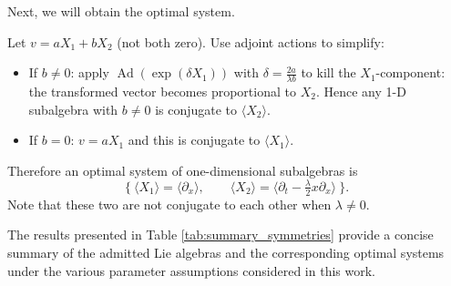 \documentclass{article}
\begin{document}
Next, we will obtain the optimal system.
\par 
Let $v=a X_1+b X_2$ (not both zero). Use adjoint actions to simplify:
\begin{itemize}
\item 
If $b\neq0$: apply $\operatorname{Ad}(\exp(\delta X_1))$ with $\delta=\tfrac{2a}{\lambda b}$ to kill the $X_1$-component: the transformed vector becomes proportional to $X_2$. Hence any 1-D subalgebra with $b\neq0$ is conjugate to $\langle X_2\rangle$.
\item  If $b=0$: $v=a X_1$ and this is conjugate to $\langle X_1\rangle$.
\end{itemize}
Therefore an optimal system of one-dimensional subalgebras is
\begin{equation*}
\{\ \langle X_1\rangle = \langle\partial_x\rangle,\qquad \langle X_2\rangle = \langle\partial_t - \tfrac{\lambda}{2} x\partial_x\rangle\ \}.
\end{equation*}
Note that these two are not conjugate to each other when $\lambda\neq0$.
\par 
The results presented in Table \ref{tab:summary_symmetries} provide a concise summary of the admitted Lie algebras and the corresponding optimal systems under the various parameter assumptions considered in this work.
\end{document}
